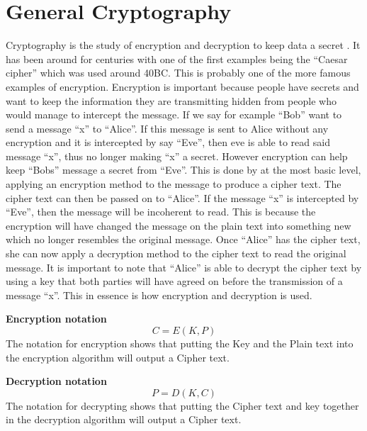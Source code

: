 \documentclass[11pt,a4paper]{report}
\begin{document}
\section{General Cryptography}
\label{sec:GenCrypt}
Cryptography is the study of encryption and decryption to keep data a secret \cite{DBLP:series/isc/DelfsK07}. It has been around for centuries with one of the first examples being the “Caesar cipher” which was used around 40BC. This is probably one of the more famous examples of encryption.
Encryption is important because people have secrets and want to keep the information they are transmitting hidden from people who would manage to intercept the message. If we say for example “Bob” want to send a message “x” to “Alice”. If this message is sent to Alice without any encryption and it is intercepted by say “Eve”, then eve is able to read said message “x”, thus no longer making “x” a secret. However encryption can help keep “Bobs” message a secret from “Eve”. This is done by at the most basic level, applying an encryption method to the message to produce a cipher text. The cipher text can then be passed on to “Alice”. If the message “x” is intercepted by “Eve”, then the message will be incoherent to read. This is because the encryption will have changed the message on the plain text into something new which no longer resembles the original message. Once “Alice” has the cipher text, she can now apply a decryption method to the cipher text to read the original message. It is important to note that “Alice” is able to decrypt the cipher text by using a key that both parties will have agreed on before the transmission of a message “x”. This in essence is how encryption and decryption is used.\newline

\textbf{Encryption notation}
\begin{displaymath}
C = E (K, P)
\end{displaymath}
The notation for encryption shows that putting the Key and the Plain text into the encryption algorithm will output a Cipher text. \newline

\textbf{Decryption notation}
\begin{displaymath}
P = D (K, C)
\end{displaymath}
The notation for decrypting shows that putting the Cipher text and key together in the decryption algorithm will output a Cipher text.\newline
\end{document}

